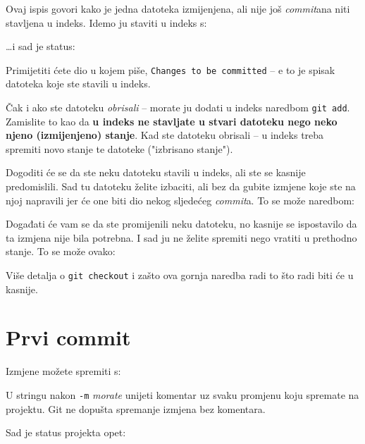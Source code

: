 

Ovaj ispis govori kako je jedna datoteka izmijenjena, ali nije još \emph{commit}ana niti stavljena u indeks.
Idemo ju staviti u indeks s:


\dots{}i sad je status:



Primijetiti ćete dio u kojem piše, \texttt{Changes to be committed} -- e to je spisak datoteka koje ste stavili u indeks.

Čak i ako ste datoteku \emph{obrisali} -- morate ju dodati u indeks naredbom \verb+git add+.
Zamislite to kao da \textbf{u indeks ne stavljate u stvari datoteku nego neko njeno (izmijenjeno) stanje}.
Kad ste datoteku obrisali -- u indeks treba spremiti novo stanje te datoteke ("izbrisano stanje").

Dogoditi će se da ste neku datoteku stavili u indeks, ali ste se kasnije predomislili. 
Sad tu datoteku želite izbaciti, ali bez da gubite izmjene koje ste na njoj napravili jer će one biti dio nekog sljedećeg \emph{commit}a.
To se može naredbom:


Događati će vam se da ste promijenili neku datoteku, no kasnije se ispostavilo da ta izmjena nije bila potrebna. 
I sad ju ne želite spremiti nego vratiti u prethodno stanje.
To se može ovako:


Više detalja o \verb+git checkout+ i zašto ova gornja naredba radi to što radi biti će u kasnije.

\section*{Prvi commit}

Izmjene možete spremiti s:


U stringu nakon \verb+-m+ \emph{morate} unijeti komentar uz svaku promjenu koju spremate na projektu.
Git ne dopušta spremanje izmjena bez komentara.

Sad je status projekta opet:



